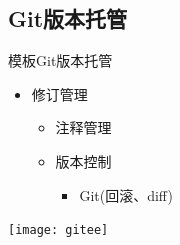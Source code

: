 \documentclass[fontset = none, xcolor=svgnames, t, aspectratio=169]{ctexbeamer}
\begin{document}
\subsection[Git托管]{Git版本托管}
\begin{frame}{\nwafuprojrep 模板}{Git版本托管}
  \begin{itemize}
  \item 修订管理
    \begin{itemize}
    \item 注释管理
    \item 版本控制
      \begin{itemize}
      \item Git(回滚、diff)
      \end{itemize}
    \end{itemize}
  \end{itemize}
  \begin{center}
    \texttt{[image: gitee]}\quad
    \scalebox{0.8}{
      
    }
  \end{center}
\end{frame}
\end{document}
